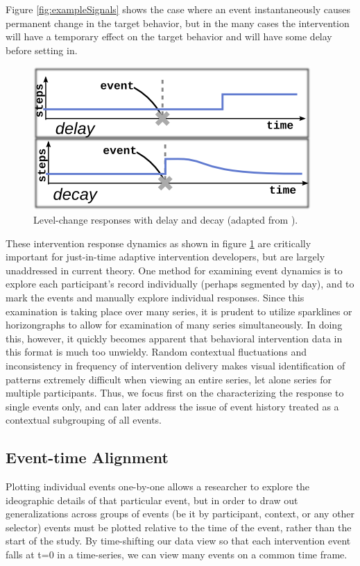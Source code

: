 Figure \ref{fig:exampleSignals} shows the case where an event instantaneously causes permanent change in the target behavior, but in the many cases the intervention will have a temporary effect on the target behavior and will have some delay before setting in.

\begin{figure}
\centering
\includegraphics[width=0.6\columnwidth]{./img/exampleDynamicComplications.png}
\caption{Level-change responses with delay and decay (adapted from \cite{glass1975}).}
\label{fig:exampleComplications}
\end{figure}

These intervention response dynamics as shown in figure \ref{fig:exampleComplications} are critically important for just-in-time adaptive intervention developers, but are largely unaddressed in current theory.
One method for examining event dynamics is to explore each participant's record individually (perhaps segmented by day), and to mark the events and manually explore individual responses.
Since this examination is taking place over many series, it is prudent to utilize sparklines \cite{tufte2006} or horizongraphs \cite{reijner2008} to allow for examination of many series simultaneously.
In doing this, however, it quickly becomes apparent that behavioral intervention data in this format is much too unwieldy.
Random contextual fluctuations and inconsistency in frequency of intervention delivery makes visual identification of patterns extremely difficult when viewing an entire series, let alone series for multiple participants. 
Thus, we focus first on the characterizing the response to single events only, and can later address the issue of event history treated as a contextual subgrouping of all events.

\subsection{Event-time Alignment}
Plotting individual events one-by-one allows a researcher to explore the ideographic details of that particular event, but in order to draw out generalizations across groups of events (be it by participant, context, or any other selector) events must be plotted relative to the time of the event, rather than the start of the study.
By time-shifting our data view so that each intervention event falls at t=0 in a time-series, we can view many events on a common time frame.

